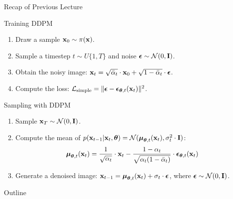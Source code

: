 \documentclass{beamer}
\begin{document}
\begin{frame}{Recap of Previous Lecture}
	\begin{block}{Training DDPM}
		\begin{enumerate}
			\item Draw a sample $\mathbf{x}_0 \sim \pi(\mathbf{x})$.
			\item Sample a timestep $t \sim U\{1, T\}$ and noise $\boldsymbol{\epsilon} \sim \mathcal{N}(0, \mathbf{I})$.
			\item Obtain the noisy image: $\mathbf{x}_t = \sqrt{\bar{\alpha}_t} \cdot \mathbf{x}_0 + \sqrt{1 - \bar{\alpha}_t} \cdot \boldsymbol{\epsilon}$.
			\item Compute the loss: $ \mathcal{L}_{\text{simple}} = \| \boldsymbol{\epsilon} - \boldsymbol{\epsilon}_{\boldsymbol{\theta}, t}(\mathbf{x}_t) \|^2 $.
		\end{enumerate}
	\end{block}
	\begin{block}{Sampling with DDPM}
		\begin{enumerate}
			\item Sample $\mathbf{x}_T \sim \mathcal{N}(0, \mathbf{I})$.
			\item Compute the mean of $p(\mathbf{x}_{t-1} | \mathbf{x}_t, \boldsymbol{\theta}) = \mathcal{N}(\boldsymbol{\mu}_{\boldsymbol{\theta}, t}(\mathbf{x}_t), \sigma_t^2 \cdot \mathbf{I})$:
			\[
				\boldsymbol{\mu}_{\boldsymbol{\theta}, t}(\mathbf{x}_t) = \frac{1}{\sqrt{\alpha_t}} \cdot \mathbf{x}_t - \frac{1 - \alpha_t}{\sqrt{\alpha_t (1 - \bar{\alpha}_t)}} \cdot \boldsymbol{\epsilon}_{\boldsymbol{\theta}, t}(\mathbf{x}_t)
			\]
			\vspace{-0.3cm}
			\item Generate a denoised image: $\mathbf{x}_{t - 1} = \boldsymbol{\mu}_{\boldsymbol{\theta}, t}(\mathbf{x}_t) +  \sigma_t \cdot \boldsymbol{\epsilon}$, where $\boldsymbol{\epsilon} \sim \mathcal{N}(0, \mathbf{I})$.
		\end{enumerate}
	\end{block}
\end{frame}
\begin{frame}{Outline}
	\tableofcontents
\end{frame}
\end{document}
